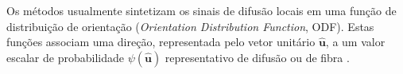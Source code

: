 \documentclass[
    12pt,                %
    oneside,            %
    a4paper,            %
    english,            %
    french,                %
    spanish,            %
    brazil                %
    ]{abntex2}
\begin{document}


%


Os métodos usualmente sintetizam os sinais de difusão locais em uma função de distribuição de orientação (\textit{Orientation Distribution Function}, ODF). Estas funções associam uma direção, representada pelo vetor unitário $\mathbf{\hat{u}}$, a um valor escalar de probabilidade $\psi(\mathbf{\hat{u}})$ representativo de difusão \cite{TuchQBall2004, wedeen2005} ou de fibra \cite{Tournier2004DirectEO, tournier2007}. %
\end{document}
